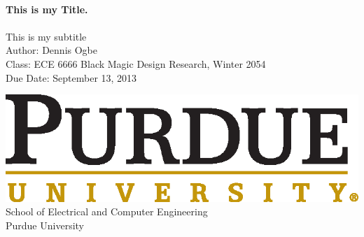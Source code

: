 %
%
%

\begin{titlepage}
\begin{center}
\thispagestyle{empty}
\vspace*{2.5cm}

\Huge
\HRule \\
\vspace{0.5cm}
\textbf{This is my Title.}\\
\HRule \\

\vspace{0.1cm}
\large
This is my subtitle\\
\normalsize
\vspace{1.5cm}
Author: Dennis Ogbe
\\
\vspace{0.5cm}
Class: ECE 6666 Black Magic Design Research, Winter 2054
\\
\vspace{0.5cm}
Due Date: September 13, 2013

\vspace{4.5cm}

\includegraphics[scale=0.8]{./title/PU_signature_KOG_cmyk_Reg.eps}\\
\vspace*{0.5cm}
School of Electrical and Computer Engineering\\
\vspace{0.5cm}
Purdue University


\end{center}
\end{titlepage}
\setcounter{page}{2}
